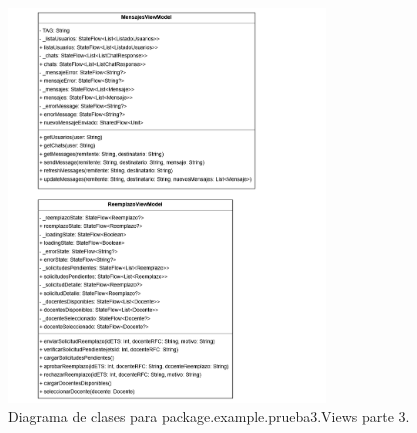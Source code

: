 \begin{figure}[htbp!]
	\begin{center}
		\includegraphics[width=0.75\textwidth]{DiagramasMoviles/DCM (9)}
		\caption{Diagrama de clases para package.example.prueba3.Views parte 3.}
		\label{fig:Views3}
	\end{center}
\end{figure}

\newpage